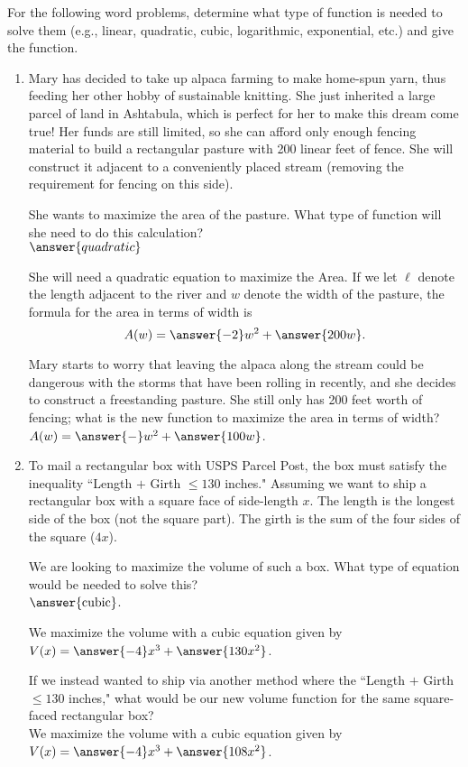 \documentclass{ximera}
\author{Elizabeth Campolongo}
\begin{document}
\begin{exercise}
For the following word problems, determine what type of function is needed to solve them (e.g., linear, quadratic, cubic, logarithmic, exponential, etc.) and give the function. 
%
\begin{enumerate}
%
\item Mary has decided to take up alpaca farming to make home-spun yarn, thus feeding her other hobby of sustainable knitting. She just inherited a large parcel of land in Ashtabula, which is perfect for her to make this dream come true! Her funds are still limited, so she can afford only enough fencing material to build a rectangular pasture with 200 linear feet of fence. She will construct it adjacent to a conveniently placed stream (removing the requirement for fencing on this side). 

She wants to maximize the area of the pasture. What type of function will she need to do this calculation?\\
$\answer{quadratic}$
\begin{exercise}
She will need a quadratic equation to maximize the Area. If we let $\ell$ denote the length adjacent to the river and $w$ denote the width of the pasture, the formula for the area in terms of width is
$$A(w) = \answer{-2}w^2 + \answer{200w}.$$

\begin{exercise} %
Mary starts to worry that leaving the alpaca along the stream could be dangerous with the storms that have been rolling in recently, and she decides to construct a freestanding pasture. She still only has 200 feet worth of fencing; what is the new function to maximize the area in terms of width?\\
$A(w) = \answer{-}w^2 + \answer{100w}$.
\end{exercise}
\end{exercise}

\item To mail a rectangular box with USPS Parcel Post, the box must satisfy the inequality ``Length $+$ Girth $\leq 130$ inches." Assuming we want to ship a rectangular box with a square face of side-length $x$. The length is the longest side of the box (not the square part). The girth is the sum of the four sides of the square ($4x$).

We are looking to maximize the volume of such a box. What type of equation would be needed to solve this?\\
$\answer{\text{cubic}}$.
%
\begin{exercise}
We maximize the volume with a cubic equation given by $V(x) = \answer{-4}x^3+\answer{130x^2}$.
\begin{exercise}
If we instead wanted to ship via another method where the ``Length $+$ Girth $\leq 130$ inches," what would be our new volume function for the same square-faced rectangular box?\\
We maximize the volume with a cubic equation given by $V(x) = \answer{-4}x^3+\answer{108x^2}$.
\end{exercise}
\end{exercise}



\end{enumerate}
\end{exercise}
\end{document}
